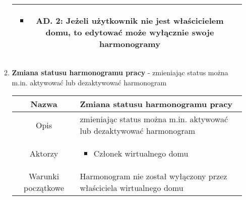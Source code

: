 \documentclass{article}
\begin{document}
\begin{enumerate}
\begin{enumerate}
\begin{table}[H]
\begin{tabular}{|c|p{7cm}|}
\begin{itemize}
\item AD. 2: Jeżeli użytkownik nie jest właścicielem domu, to edytować może wyłącznie swoje harmonogramy\end{itemize}                                                                                                                                                   \\
						\hline
					\end{tabular}
				\end{table}

			\item \textbf{Zmiana statusu harmonogramu pracy} - zmieniając status można
				m.in. aktywować lub dezaktywować harmonogram

				\begin{table}[H]
					\centering
					\begin{tabular}{|c|p{7cm}|}
						\hline
						Nazwa                   & Zmiana statusu harmonogramu pracy                                                                                                                                                                                                                                                                                                                   \\
						\hline
						Opis                    & zmieniając status można m.in. aktywować lub dezaktywować harmonogram                                                                                                                                                                                                                                                                                \\
						\hline
						Aktorzy                 & \begin{itemize}\item Członek wirtualnego domu\end{itemize}                                                                                                                                                                                                                                                                                          \\
						\hline
						Warunki początkowe      & Harmonogram nie został wyłączony przez właściciela wirtualnego domu                                                                                                                                                                                                                                                                                 \\

\end{tabular}
\end{table}
\end{enumerate}
\end{enumerate}
\end{document}
